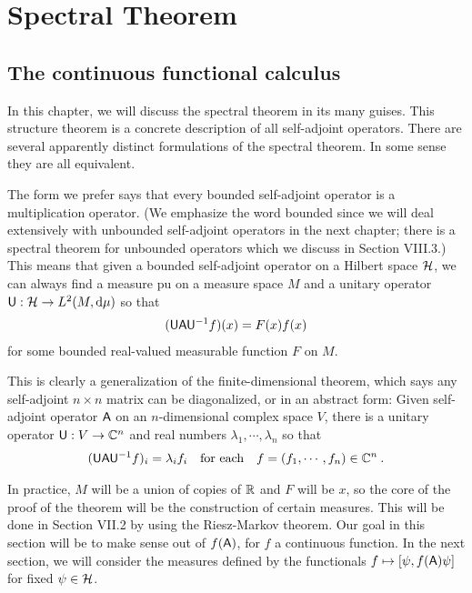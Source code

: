 \section{Spectral Theorem}

\subsection{The continuous functional calculus}

In this chapter, we will discuss the spectral theorem in its many guises. This structure theorem is a concrete description of all self-adjoint operators. There are several apparently distinct formulations of the spectral theorem. In some sense they are all equivalent.

The form we prefer says that every bounded self-adjoint operator is a multiplication operator. (We emphasize the word bounded since we will deal extensively with unbounded self-adjoint operators in the next chapter; there is a spectral theorem for unbounded operators which we discuss in Section VIII.3.) This means that given a bounded self-adjoint operator on a Hilbert space $\mathcal{H}$, we can always find a measure pu on a measure space $M$ and a unitary operator $\mathsf{U}: \mathcal{H} \to L^{2}(M, \mathrm{d} \mu)$ so that
\begin{align}
    (\mathsf{U} \mathsf{A} \mathsf{U}^{-1} f)(x) = F(x)f(x)
\end{align}
for some bounded real-valued measurable function $F$ on $M$.

This is clearly a generalization of the finite-dimensional theorem, which says any self-adjoint $n \times n$ matrix can be diagonalized, or in an abstract form: Given self-adjoint operator $\mathsf{A}$ on an $n$-dimensional complex space $V$,
there is a unitary operator $\mathsf{U}: V \to \mathbb{C}^n$ and real numbers $\lambda_1, \cdots, \lambda_n$ so that \begin{align}
    (\mathsf{U} \mathsf{A} \mathsf{U}^{-1} f)_i = \lambda_i f_i \quad \text{for each} \quad f = (f_1, \cdots, f_n) \in \mathbb{C}^n \:.
\end{align}

In practice, $M$ will be a union of copies of $\mathbb{R}$ and $F$ will be $x$, so the core of the proof of the theorem will be the construction of certain measures.
This will be done in Section VII.2 by using the Riesz-Markov theorem. Our goal in this section will be to make sense out of $f(\mathsf{A})$, for $f$ a continuous function. In the next section, we will consider the measures defined by the functionals $f \mapsto [\psi, f(\mathsf{A}) \psi]$ for fixed $\psi \in \mathcal{H}$.

